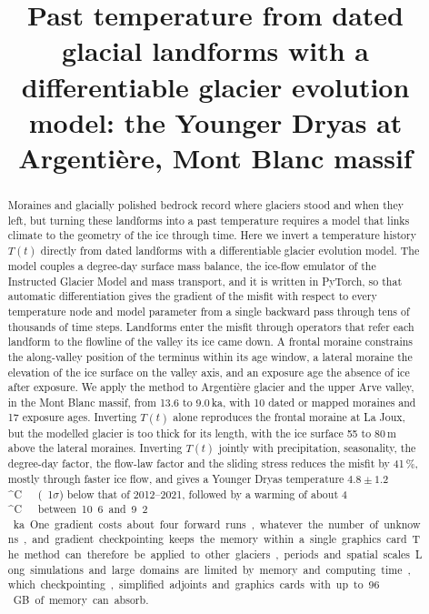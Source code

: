 \documentclass[tc, manuscript]{copernicus}
\newcommand{\degC}{\unit{^{\circ}C}}
\begin{document}
\title{Past temperature from dated glacial landforms with a differentiable glacier evolution model: the Younger Dryas at Argenti\`ere, Mont Blanc massif}





\received{}
\pubdiscuss{}
\revised{}
\accepted{}
\published{}


\maketitle

\begin{abstract}
Moraines and glacially polished bedrock record where glaciers stood and when they left, but turning these landforms into a past temperature requires a model that links climate to the geometry of the ice through time. Here we invert a temperature history $T(t)$ directly from dated landforms with a differentiable glacier evolution model. The model couples a degree-day surface mass balance, the ice-flow emulator of the Instructed Glacier Model and mass transport, and it is written in PyTorch, so that automatic differentiation gives the gradient of the misfit with respect to every temperature node and model parameter from a single backward pass through tens of thousands of time steps. Landforms enter the misfit through operators that refer each landform to the flowline of the valley its ice came down. A frontal moraine constrains the along-valley position of the terminus within its age window, a lateral moraine the elevation of the ice surface on the valley axis, and an exposure age the absence of ice after exposure. We apply the method to Argenti\`ere glacier and the upper Arve valley, in the Mont Blanc massif, from 13.6 to 9.0\,ka, with 10 dated or mapped moraines and 17 exposure ages. Inverting $T(t)$ alone reproduces the frontal moraine at La Joux, but the modelled glacier is too thick for its length, with the ice surface 55 to 80\,m above the lateral moraines. Inverting $T(t)$ jointly with precipitation, seasonality, the degree-day factor, the flow-law factor and the sliding stress reduces the misfit by 41\,\%, mostly through faster ice flow, and gives a Younger Dryas temperature $4.8\pm1.2$\,\degC\ (1$\sigma$) below that of 2012--2021, followed by a warming of about 4\,\degC\ between 10.6 and 9.2\,ka. One gradient costs about four forward runs, whatever the number of unknowns, and gradient checkpointing keeps the memory within a single graphics card. The method can therefore be applied to other glaciers, periods and spatial scales. Long simulations and large domains are limited by memory and computing time, which checkpointing, simplified adjoints and graphics cards with up to 96\,GB of memory can absorb.
\end{abstract}
\end{document}
